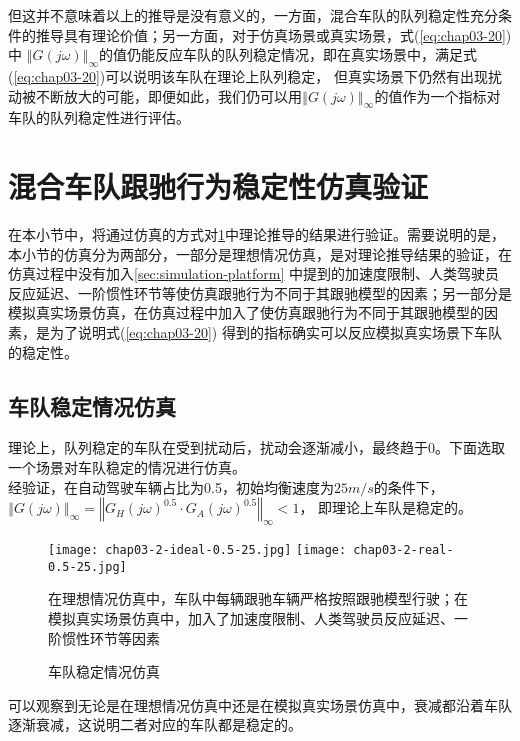 但这并不意味着以上的推导是没有意义的，一方面，混合车队的队列稳定性充分条件的推导具有理论价值；另一方面，对于仿真场景或真实场景，式(\ref{eq:chap03-20})中
$\left\Vert G(j\omega) \right\Vert_{\infty}$的值仍能反应车队的队列稳定情况，即在真实场景中，满足式(\ref{eq:chap03-20})可以说明该车队在理论上队列稳定，
但真实场景下仍然有出现扰动被不断放大的可能，即便如此，我们仍可以用$\left\Vert G(j\omega) \right\Vert_{\infty}$的值作为一个指标对车队的队列稳定性进行评估。


\section{混合车队跟驰行为稳定性仿真验证}
\label{sec:3.3}

在本小节中，将通过仿真的方式对\ref{sec:3.3}中理论推导的结果进行验证。需要说明的是，本小节的仿真分为两部分，一部分是理想情况仿真，是对理论推导结果的验证，在仿真过程中没有加入\ref{sec:simulation-platform}
中提到的加速度限制、人类驾驶员反应延迟、一阶惯性环节等使仿真跟驰行为不同于其跟驰模型的因素；另一部分是模拟真实场景仿真，在仿真过程中加入了使仿真跟驰行为不同于其跟驰模型的因素，是为了说明式(\ref{eq:chap03-20})
得到的指标确实可以反应模拟真实场景下车队的稳定性。

\subsection{车队稳定情况仿真}

理论上，队列稳定的车队在受到扰动后，扰动会逐渐减小，最终趋于0。下面选取一个场景对车队稳定的情况进行仿真。\\

经验证，在自动驾驶车辆占比为0.5，初始均衡速度为$25m/s$的条件下，$\left\Vert G(j\omega) \right\Vert_{\infty} = \left\Vert G_H(j\omega)^{0.5} \cdot G_A(j\omega)^{0.5} \right\Vert_{\infty} < 1$，
即理论上车队是稳定的。

\begin{figure}
  \centering
    {\texttt{[image: chap03-2-ideal-0.5-25.jpg]}}
    {\texttt{[image: chap03-2-real-0.5-25.jpg]}}
    \caption*{在理想情况仿真中，车队中每辆跟驰车辆严格按照跟驰模型行驶；在模拟真实场景仿真中，加入了加速度限制、人类驾驶员反应延迟、一阶惯性环节等因素}
    \caption{车队稳定情况仿真}
  \label{fig:chap03-2}
\end{figure}

可以观察到无论是在理想情况仿真中还是在模拟真实场景仿真中，衰减都沿着车队逐渐衰减，这说明二者对应的车队都是稳定的。

